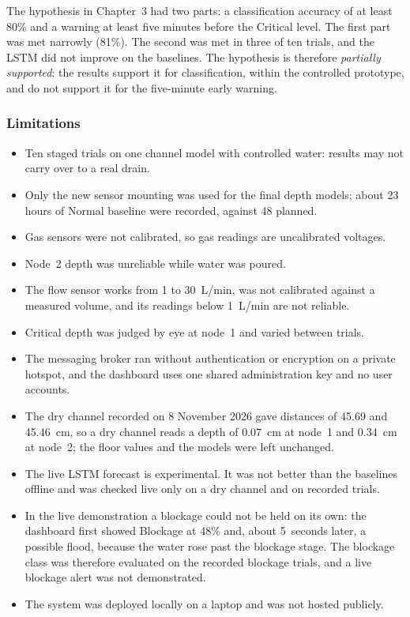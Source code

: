 \documentclass[12pt, a4paper]{article}
\begin{document}
The hypothesis in Chapter~3 had two parts: a classification accuracy of at least 80\% and a warning at least five minutes before the Critical level. The first part was met narrowly (81\%). The second was met in three of ten trials, and the LSTM did not improve on the baselines. The hypothesis is therefore \emph{partially supported}: the results support it for classification, within the controlled prototype, and do not support it for the five-minute early warning.

\subsubsection{Limitations}

\begin{itemize}
\item Ten staged trials on one channel model with controlled water: results may not carry over to a real drain.
\item Only the new sensor mounting was used for the final depth models; about 23 hours of Normal baseline were recorded, against 48 planned.
\item Gas sensors were not calibrated, so gas readings are uncalibrated voltages.
\item Node~2 depth was unreliable while water was poured.
\item The flow sensor works from 1 to 30~L/min, was not calibrated against a measured volume, and its readings below 1~L/min are not reliable.
\item Critical depth was judged by eye at node~1 and varied between trials.
\item The messaging broker ran without authentication or encryption on a private hotspot, and the dashboard uses one shared administration key and no user accounts.
\item The dry channel recorded on 8 November 2026 gave distances of 45.69 and 45.46~cm, so a dry channel reads a depth of 0.07~cm at node~1 and 0.34~cm at node~2; the floor values and the models were left unchanged.
\item The live LSTM forecast is experimental. It was not better than the baselines offline and was checked live only on a dry channel and on recorded trials.
\item In the live demonstration a blockage could not be held on its own: the dashboard first showed Blockage at 48\% and, about 5~seconds later, a possible flood, because the water rose past the blockage stage. The blockage class was therefore evaluated on the recorded blockage trials, and a live blockage alert was not demonstrated.
\item The system was deployed locally on a laptop and was not hosted publicly.
\end{itemize}
\end{document}
